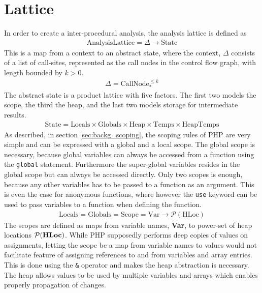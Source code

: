 
\section{Lattice}
\label{sec:lattice}
In order to create a inter-procedural analysis, the analysis lattice is defined as
\begin{align}
\text{AnalysisLattice} = \Delta \rightarrow \text{State}
\end{align}
This is a map from a context to an abstract state, where the context, $\Delta$ consists of a list of call-sites, represented as the call nodes in the control flow graph, with length bounded by $k>0$. 
\begin{align}
\Delta = \text{CallNode}_*^{\leq k}
\end{align}
The abstract state is a product lattice with five factors. The first two models the scope, the third the heap, and the last two models storage for intermediate results. 
\begin{align}
\text{State} = \text{Locals} \times \text{Globals} \times \text{Heap} \times \text{Temps} \times \text{HeapTemps} 
\end{align}
As described, in section \ref{sec:backg_scoping}, the scoping rules of PHP are very simple and can be expressed with a global and a local scope. The global scope is necessary, because global variables can always be accessed from a function using the \texttt{global} statement. Furthermore the super-global variables resides in the global scope but can always be accessed directly. Only two scopes is enough, because any other variables has to be passed to a function as an argument. This is even the case for anonymous functions, where however the \texttt{use} keyword can be used to pass variables to a function when defining the function.
\begin{align}
\text{Locals} = \text{Globals} = \text{Scope} = \text{Var} \rightarrow \mathcal{P}(\text{HLoc})
\end{align}
The scopes are defined as maps from variable names, {\bf Var}, to power-set of heap locations $\mathcal{P}(\text{\bf HLoc})$. While PHP supposedly performs deep copies of values on assignments, letting the scope be a map from variable names to values would not facilitate feature of assigning references to and from variables and array entries. This is done using the \texttt{\&} operator and makes the heap abstraction is necessary. The heap allows values to be used by multiple variables and arrays which enables properly propagation of changes. 
